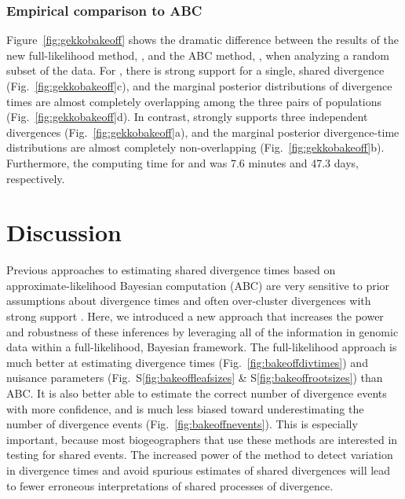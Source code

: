 \subsubsection{Empirical comparison to ABC}

Figure~\ref{fig:gekkobakeoff} shows the dramatic difference between the results
of the new full-likelihood method, \ecoevolity, and the ABC method,
\dppmsbayes, when analyzing a random subset of the  data.
For \dppmsbayes, there is strong support for a single, shared divergence
(Fig.~\ref{fig:gekkobakeoff}c),
and the marginal posterior distributions of divergence times are almost
completely overlapping among the three pairs of populations
(Fig.~\ref{fig:gekkobakeoff}d).
In contrast,
\ecoevolity strongly supports three independent divergences
(Fig.~\ref{fig:gekkobakeoff}a),
and the marginal posterior divergence-time distributions are almost completely
non-overlapping
(Fig.~\ref{fig:gekkobakeoff}b).
Furthermore, the computing time for \ecoevolity and \dppmsbayes was 7.6
minutes and 47.3 days, respectively.

\ifembed{

}{}


\section{Discussion}

Previous approaches to estimating shared divergence times based on
approximate-likelihood Bayesian computation (ABC) are very sensitive to prior
assumptions about divergence times and often over-cluster divergences with
strong support
\citep{Oaks2012,Hickerson2013,Oaks2014reply,Oaks2014dpp}.
Here, we introduced a new approach that increases the power and robustness of
these inferences by leveraging all of the information in genomic data within a
full-likelihood, Bayesian framework.
The full-likelihood approach is much better at estimating
divergence times
(Fig.~\ref{fig:bakeoffdivtimes})
and nuisance parameters
(Fig.\ S\ref{fig:bakeoffleafsizes} \& S\ref{fig:bakeoffrootsizes})
than ABC.
It is also better able to estimate the correct number of divergence events with
more confidence, and is much less biased toward underestimating the number of
divergence events
(Fig.~\ref{fig:bakeoffnevents}).
This is especially important, because most biogeographers that use these
methods are interested in testing for shared events.
The increased power of the method to detect variation in divergence times and
avoid spurious estimates of shared divergences will lead to fewer erroneous
interpretations of shared processes of divergence.


